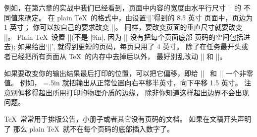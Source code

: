 例如，在第六章的实战中我们已经看到，页面中内容的宽度由水平行尺寸 |\hsize| 的%
不同值来确定。%
在 plain \TeX\ 的格式中，由设置`|\hsize=6.5in|'得到的 8.5 英寸%
页面中，页边为 1 英寸；
你可以按自己的要求改变 |\hsize|。%
同样，要改变页面的垂直尺寸就要改变 |\vsize|。%
Plain \TeX\ 设置 |\vsize=8.9in|(不是 |9in|, 因为 |\vsize| 没有把每个页面底部%
页码的空间包括进去);
如果给出`|\vsize=4in|', 就得到更短的页码，每页只用了 4 英寸。%
除了在任务最开头或者已经把所有页面从 \TeX\ 的内存中去掉后以外，
最好别乱改动 |\hsize| 和 |\vsize|。

如果要改变你的输出结果最后打印的位置，可以把它偏移，即给 |\hoffset|~%
和 |\voffset| 一个非零值。%
例如，
\begintt
\hoffset=.5in   \voffset=1.5in
\endtt
就把输出从正常位置向右平移半英寸，向下平移 1.5 英寸。%
注意别偏移得超出所用打印的物理介质的边缘，
除非你知道这样超出边界不会出现问题。

 \TeX\ 常常用于排版公告，小册子或者其它没有页码的文档。%
如果在文稿开头声明了
\begintt
\nopagenumbers
\endtt
那么 plain \TeX\ 就不在每个页码的底部插入数字了。

